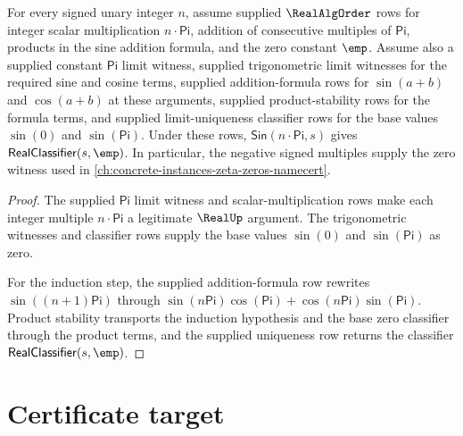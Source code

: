 \begin{theorem}
\label{thm:real-analytic-sin-pi-multiples}
For every signed unary integer $n$, assume supplied $\RealAlgOrder$ rows for integer scalar multiplication $n \cdot \mathsf{Pi}$, addition of consecutive multiples of $\mathsf{Pi}$, products in the sine addition formula, and the zero constant $\emp$. Assume also a supplied constant $\mathsf{Pi}$ limit witness, supplied trigonometric limit witnesses for the required sine and cosine terms, supplied addition-formula rows for $\sin(a+b)$ and $\cos(a+b)$ at these arguments, supplied product-stability rows for the formula terms, and supplied limit-uniqueness classifier rows for the base values $\sin(0)$ and $\sin(\mathsf{Pi})$. Under these rows, $\mathsf{Sin}(n \cdot \mathsf{Pi},s)$ gives $\mathsf{RealClassifier}(s,\emp)$. In particular, the negative signed multiples supply the zero witness used in \autoref{ch:concrete-instances-zeta-zeros-namecert}.
\end{theorem}
\begin{proof}
The supplied $\mathsf{Pi}$ limit witness and scalar-multiplication rows make each integer multiple $n \cdot \mathsf{Pi}$ a legitimate $\RealUp$ argument. The trigonometric witnesses and classifier rows supply the base values $\sin(0)$ and $\sin(\mathsf{Pi})$ as zero.

For the induction step, the supplied addition-formula row rewrites $\sin((n+1)\mathsf{Pi})$ through $\sin(n\mathsf{Pi})\cos(\mathsf{Pi})+\cos(n\mathsf{Pi})\sin(\mathsf{Pi})$. Product stability transports the induction hypothesis and the base zero classifier through the product terms, and the supplied uniqueness row returns the classifier $\mathsf{RealClassifier}(s,\emp)$.
\end{proof}

\section{Certificate target}
\label{sec:real-analytic-cert-target}

